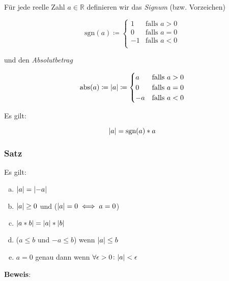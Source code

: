 \documentclass{article}
\begin{document}
Für jede reelle Zahl $a \in \mathbb{R}$ definieren wir das \emph{Signum} (bzw. Vorzeichen)

\[
  \text{sgn}(a) \coloneqq \begin{cases}
    1  & \text{falls } a > 0 \\
    0  & \text{falls } a = 0 \\
    -1 & \text{falls } a < 0 \\
  \end{cases}
\]

und den \emph{Absolutbetrag}

\[
  \text{abs}(a) \coloneqq \abs{a} \coloneqq \begin{cases}
    a  & \text{falls } a > 0 \\
    0  & \text{falls } a = 0 \\
    -a & \text{falls } a < 0 \\
  \end{cases}
\]

Es gilt:

\[
  \abs{a} = \text{sgn}(a) * a
\]

\subsubsection{Satz}

Es gilt:

\begin{enumerate}[(a)]
\item $\abs{a} = \abs{-a}$
\item $\abs{a} \geq 0$ und ($\abs{a} = 0 \iff a = 0$)
\item $\abs{a * b} = \abs{a} * \abs{b}$
\item ($a \leq b$ und $-a \leq b$) wenn $\abs{a} \leq b$
\item $a = 0$ genau dann wenn $\forall \epsilon > 0 \colon \abs{a} < \epsilon$
\end{enumerate}

\textbf{Beweis}:
\end{document}
